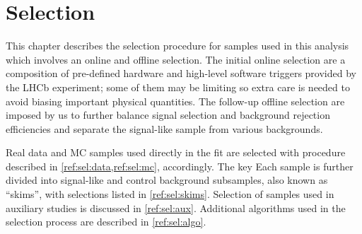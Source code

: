 \chapter{Selection}
\label{ref:sel}

This chapter describes the selection procedure for samples used in this
analysis which involves an online and offline selection.
The initial online selection are a composition of
pre-defined hardware and high-level software triggers provided by the LHCb
experiment;
some of them may be limiting so extra care is needed to avoid biasing important
physical quantities.
The follow-up offline selection are imposed by us
to further balance signal selection and background rejection efficiencies
and separate the signal-like sample from various backgrounds.

Real data and MC samples used directly in the fit are selected with procedure
described in \cref{ref:sel:data,ref:sel:mc}, accordingly.
The key
Each sample is further divided into signal-like and control background
subsamples, also known as ``skims'', with selections listed in
\cref{ref:sel:skims}.
Selection of samples used in auxiliary studies is discussed in
\cref{ref:sel:aux}.
Additional algorithms used in the selection process are described in
\cref{ref:sel:algo}.









%
%


